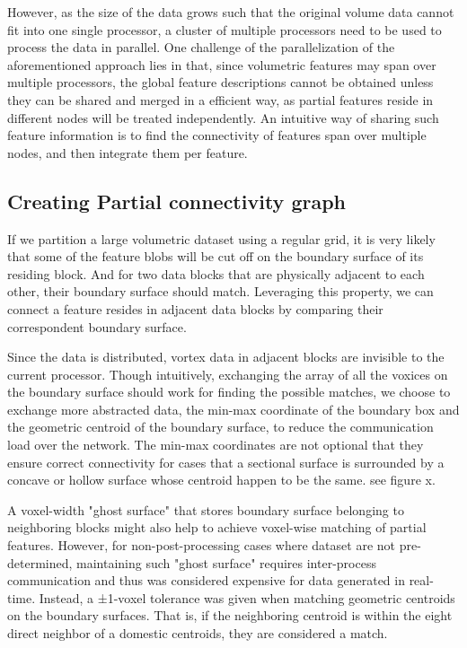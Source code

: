 \documentclass[10pt, conference, compsocconf]{IEEEtran}
\begin{document}
However, as the size of the data grows such that the original volume data cannot fit into one single processor, a cluster of multiple processors need to be used to process the data in parallel. One challenge of the parallelization of the aforementioned approach lies in that, since volumetric features may span over multiple processors, the global feature descriptions cannot be obtained unless they can be shared and merged in a efficient way, as partial features reside in different nodes will be treated independently. An intuitive way of sharing such feature information is to find the connectivity of features span over multiple nodes, and then integrate them per feature.

\subsection{Creating Partial connectivity graph}
If we partition a large volumetric dataset using a regular grid, it is very likely that some of the feature blobs will be cut off on the boundary surface of its residing block. And for two data blocks that are physically adjacent to each other, their boundary surface should match. Leveraging this property, we can connect a feature resides in adjacent data blocks by comparing their correspondent boundary surface. 

Since the data is distributed, vortex data in adjacent blocks are invisible to the current processor. Though intuitively, exchanging the array of all the voxices on the boundary surface should work for finding the possible matches, we choose to exchange more abstracted data, the min-max coordinate of the boundary box and the geometric centroid of the boundary surface, to reduce the communication load over the network. The min-max coordinates are not optional that they ensure correct connectivity for cases that a sectional surface is surrounded by a concave or hollow surface whose centroid happen to be the same. see figure x. 

A voxel-width "ghost surface" that stores boundary surface belonging to neighboring blocks might also help to achieve voxel-wise matching of partial features. However, for non-post-processing cases where dataset are not pre-determined, maintaining such "ghost surface" requires inter-process communication and thus was considered expensive for data generated in real-time. Instead, a ±1-voxel tolerance was given when matching geometric centroids on the boundary surfaces. That is, if the neighboring centroid is within the eight direct neighbor of a domestic centroids, they are considered a match.
\end{document}
